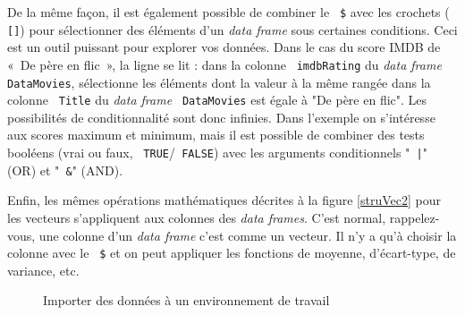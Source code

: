 \documentclass[10.5pt,a4paper]{article}
\newcommand{\rcode}[1]{\texttt{\color{rstudio} #1}}
\begin{document}
    De la même façon, il est également possible de combiner le \rcode{\$} avec les crochets (\rcode{[]}) pour sélectionner des éléments d'un \emph{data frame} sous certaines conditions. Ceci est un outil puissant pour explorer vos données. Dans le cas du score IMDB de «~De père en flic~», la ligne se lit : dans la colonne \rcode{imdbRating} du \emph{data frame} \rcode{DataMovies}, sélectionne les éléments dont la valeur à la même rangée dans la colonne \rcode{Title} du \emph{data frame} \rcode{DataMovies} est égale à "De père en flic". Les possibilités de conditionnalité sont donc infinies. Dans l'exemple on s'intéresse aux scores maximum et minimum, mais il est possible de combiner des tests booléens (vrai ou faux, \rcode{TRUE}/\rcode{FALSE}) avec les arguments conditionnels "\rcode{|}" (OR) et "\rcode{\&}" (AND). 
  
    
    Enfin, les mêmes opérations mathématiques décrites à la figure \ref{struVec2} pour les vecteurs s'appliquent aux colonnes des \emph{data frames}. C'est normal, rappelez-vous, une colonne d'un \emph{data frame} c'est comme un vecteur. Il n'y a qu'à choisir la colonne avec le \rcode{\$} et on peut appliquer les fonctions de moyenne, d'écart-type, de variance, etc.
    
    \begin{figure}[H]
    \centering
    \caption{Importer des données à un environnement de travail}
    \label{importFig}
    \end{figure}
\end{document}
